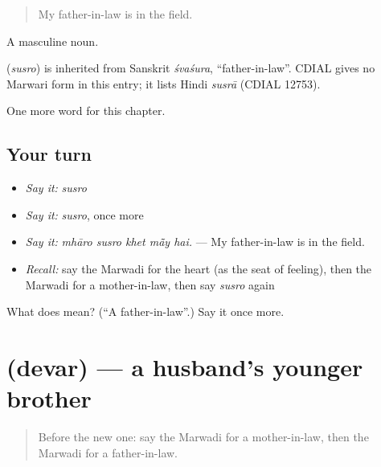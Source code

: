 \begin{quote}
My father-in-law is in the field.
\end{quote}

A masculine noun.

\begin{cousinweb}
\textbf{} (\emph{susro}) is inherited from Sanskrit \emph{śvaśura}, \textquotedblleft{}father-in-law\textquotedblright{}. CDIAL gives no Marwari form in this entry; it lists Hindi \emph{susrā} (CDIAL 12753).
\end{cousinweb}

\begin{grammarlens}[title={What you've built}]
One more word for this chapter.
\end{grammarlens}

\subsection*{Your turn}
\begin{itemize}
\raggedright
  \item \emph{Say it:} \emph{susro}
  \item \emph{Say it:} \emph{susro}, once more
  \item \emph{Say it:} \emph{mhāro susro khet mā̃y hai.} — My father-in-law is in the field.
  \item \emph{Recall:} say the Marwadi for the heart (as the seat of feeling), then the Marwadi for a mother-in-law, then say \emph{susro} again
\end{itemize}

\begin{tcolorbox}[breakable,colback=teal!4,colframe=teal!35!black,title={Before you move on}]
What does  mean? (\textquotedblleft{}A father-in-law\textquotedblright{}.) Say it once more.
\end{tcolorbox}
\section[\texorpdfstring{\mw{देवर} (devar)}{देवर (devar)}]{ (devar) — a husband's younger brother}

\label{lesson:MW-C259-devar}



\begin{quote}
Before the new one: say the Marwadi for a mother-in-law, then the Marwadi for a father-in-law.
\end{quote}

